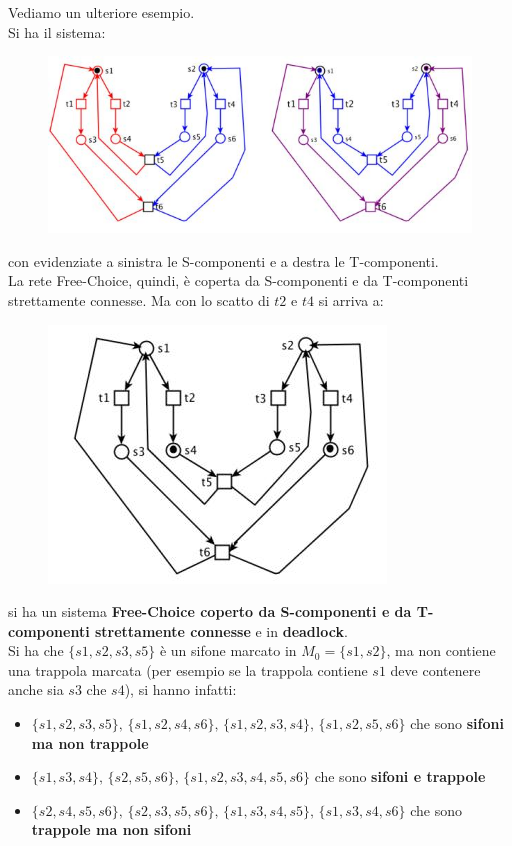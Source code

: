\documentclass[a4paper,12pt, oneside]{book}
\begin{document}
\begin{esempio}
  Vediamo un ulteriore esempio.\\
  Si ha il sistema:
  \begin{figure}[H]
    \centering
    \includegraphics[scale = 0.55]{img/fc18.jpg}
  \end{figure}
  con evidenziate a sinistra le S-componenti e a destra le T-componenti.\\
  La rete Free-Choice, quindi, è coperta da S-componenti e da T-componenti
  strettamente connesse. Ma con lo scatto di $t2$ e $t4$ si arriva a:
  \begin{figure}[H]
    \centering
    \includegraphics[scale = 0.55]{img/fc17.jpg}
  \end{figure}
  si ha un sistema \textbf{Free-Choice coperto da S-componenti e da T-componenti
    strettamente connesse} e in \textbf{deadlock}.\\
  Si ha che $\{s 1 , s 2 , s 3 , s 5 \}$ è un sifone marcato in $M_0 = \{s 1 , s
  2 \}$, ma non contiene una trappola marcata (per esempio se la trappola
  contiene $s 1$ deve contenere anche sia $s 3$ che $s 4$), si hanno infatti: 
  \begin{itemize}
    \item $\{s 1 , s 2 , s 3 , s 5 \},\, \{s 1 , s 2 , s 4 , s 6\}, \,\{s 1 , s
    2 , s 3 , s 4 \}, \,\{s 1 , s 2 , s 5 , s 6 \}$ che sono \textbf{sifoni
      ma non trappole}
    \item $\{s 1 , s 3 , s 4 \}, \,\{s 2 , s 5 , s 6 \},\, \{s 1 , s 2 , s 3 , s
    4 , s 5 , s 6 \} $ che sono \textbf{sifoni e trappole}
    \item $\{s 2 , s 4 , s 5 , s 6 \}, \,\{s 2 , s 3 , s 5 , s 6 \}, \,\{s 1 , s
    3 , s 4 , s 5 \}, \,\{s 1 , s 3 , s 4 , s 6 \} $ che sono \textbf{trappole
      ma non sifoni}
  \end{itemize}
\end{esempio}
\end{document}
